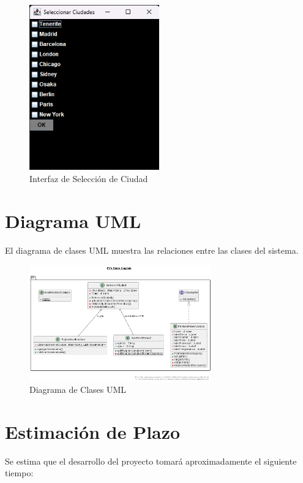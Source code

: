 \documentclass{article}
\begin{document}
\begin{figure}[H]
    \centering
    \includegraphics[width=0.5\textwidth]{Seleccion_ciudades.png}
    \caption{Interfaz de Selección de Ciudad}
    \label{fig:seleccion_ciudad}
\end{figure}

\section{Diagrama UML}
El diagrama de clases UML muestra las relaciones entre las clases del sistema.

\begin{figure}[H]
    \centering
    \includegraphics[width=0.7\textwidth]{Diagrama_clases.png}
    \caption{Diagrama de Clases UML}
    \label{fig:diagrama_clases}
\end{figure}

\section{Estimación de Plazo}
Se estima que el desarrollo del proyecto tomará aproximadamente el siguiente tiempo:
\end{document}
